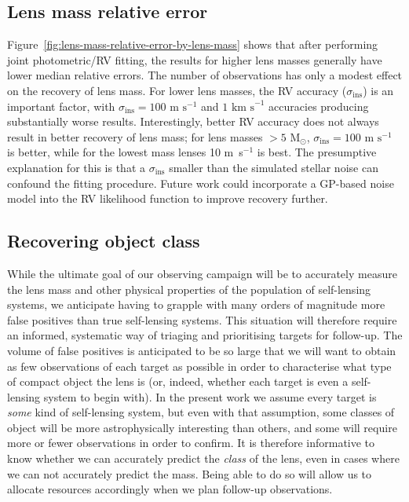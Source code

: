 \documentclass[fleqn,usenatbib]{mnras}
\begin{document}
\subsection{Lens mass relative error}

Figure~\ref{fig:lens-mass-relative-error-by-lens-mass} shows that after performing joint photometric/RV fitting, the results for higher lens masses generally have lower median relative errors. The number of observations has only a modest effect on the recovery of lens mass. For lower lens masses, the RV accuracy ($\sigma_\mathrm{ins}$) is an important factor, with $\sigma_\mathrm{ins} = 100 \text{ m s}^{-1}$ and $1 \text{ km s}^{-1}$ accuracies producing substantially worse results. Interestingly, better RV accuracy does not always result in better recovery of lens mass; for lens masses $> 5 \text{ M}_\odot$, $\sigma_\mathrm{ins} = 100 \text{ m s}^{-1}$ is better, while for the lowest mass lenses 10 m~s$^{-1}$ is best. The presumptive explanation for this is that a $\sigma_\mathrm{ins}$ smaller than the simulated stellar noise can confound the fitting procedure. Future work could incorporate a GP-based noise model into the RV likelihood function to improve recovery further.

\subsection{Recovering object class}
While the ultimate goal of our observing campaign will be to accurately measure the lens mass and other physical properties of the population of self-lensing systems, we anticipate having to grapple with many orders of magnitude more false positives than true self-lensing systems. This situation will therefore require an informed, systematic way of triaging and prioritising targets for follow-up. The volume of false positives is anticipated to be so large that we will want to obtain as few observations of each target as possible in order to characterise what type of compact object the lens is (or, indeed, whether each target is even a self-lensing system to begin with). In the present work we assume every target is \textit{some} kind of self-lensing system, but even with that assumption, some classes of object will be more astrophysically interesting than others, and some will require more or fewer observations in order to confirm. It is therefore informative to know whether we can accurately predict the \textit{class} of the lens, even in cases where we can not accurately predict the mass. Being able to do so will allow us to allocate resources accordingly when we plan follow-up observations.
\end{document}
